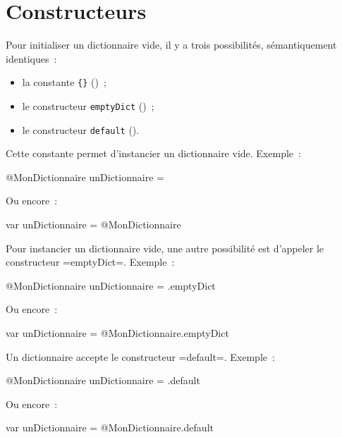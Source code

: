 \section{Constructeurs}

Pour initialiser un dictionnaire vide, il y a trois possibilités, sémantiquement identiques~:
\begin{itemize}
  \item la constante \texttt{\{\}} ()~;
  \item le constructeur \texttt{emptyDict} ()~;
  \item le constructeur \texttt{default} ().
\end{itemize}



Cette constante permet d'instancier un dictionnaire vide. Exemple~:
\begin{galgas3}
@MonDictionnaire unDictionnaire = {}
\end{galgas3}

Ou encore~:

\begin{galgas3}
var unDictionnaire = @MonDictionnaire {}
\end{galgas3}


Pour instancier un dictionnaire vide, une autre possibilité est d'appeler le constructeur \ggst=emptyDict=. Exemple~:
\begin{galgas3}
@MonDictionnaire unDictionnaire = .emptyDict
\end{galgas3}

Ou encore~:

\begin{galgas3}
var unDictionnaire = @MonDictionnaire.emptyDict
\end{galgas3}





Un dictionnaire accepte le constructeur \ggst=default=. Exemple~:
\begin{galgas3}
@MonDictionnaire unDictionnaire = .default
\end{galgas3}

Ou encore~:

\begin{galgas3}
var unDictionnaire = @MonDictionnaire.default
\end{galgas3}






